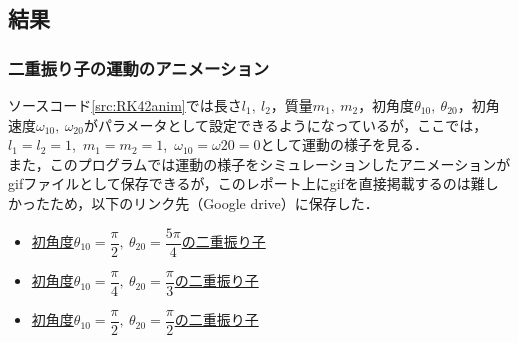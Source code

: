 \documentclass[a4paper,11pt]{jsarticle}
\begin{document}
\subsection{結果}

\subsubsection{二重振り子の運動のアニメーション}
ソースコード\ref{src:RK42anim}では長さ\(l_1,\ l_2\)，質量\(m_1,\ m_2\)，初角度\(\theta_{10},\ \theta_{20}\)，初角速度\(\omega_{10},\ \omega_{20}\)がパラメータとして設定できるようになっているが，ここでは，\(l_1 = l_2 =1\),\ \(m_1 = m_2 =1\),\ \(\omega_{10} = \omega{20} = 0\)として運動の様子を見る．\\
また，このプログラムでは運動の様子をシミュレーションしたアニメーションがgifファイルとして保存できるが，このレポート上にgifを直接掲載するのは難しかったため，以下のリンク先（Google drive）に保存した．
\begin{itemize}
  \item \href{https://drive.google.com/file/d/1MPjW_B_pwXl1CM5LKhAw7Za5CbDMDMm1/view?usp=sharing}{初角度\(\theta_{10} = \dfrac{\pi}{2},\ \theta_{20} = \dfrac{5\pi}{4}\)の二重振り子}
  \item \href{https://drive.google.com/file/d/1TJpUKRKpi0ewUbH6xrBYIEyFGCoGV60K/view?usp=sharing}{初角度\(\theta_{10} = \dfrac{\pi}{4},\ \theta_{20} = \dfrac{\pi}{3}\)の二重振り子}
  \item \href{https://drive.google.com/file/d/1aUWOTSOAlM5S7ICsEniOS-E7f1XcNfjs/view?usp=sharing}{初角度\(\theta_{10} = \dfrac{\pi}{2},\ \theta_{20} = \dfrac{\pi}{2}\)の二重振り子}
\end{itemize}

\newpage
\end{document}
